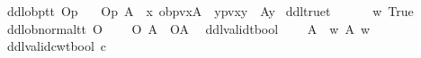 \begin{isabellebody}
\isamarkupfalse%
\ ddlobp{\isacharcolon}{\isacharcolon}{\isachardoublequoteopen}t{\isasymRightarrow}t{\isachardoublequoteclose}\ {\isacharparenleft}{\isachardoublequoteopen}O\isactrlsub p{\isachardoublequoteclose}{\isacharparenright}\isanewline
\ \ \ {\isachardoublequoteopen}O\isactrlsub p\ A\ {\isasymequiv}\ {\isasymlambda}x{\isachardot}\ ob{\isacharparenleft}pv{\isacharparenleft}x{\isacharparenright}{\isacharparenright}{\isacharparenleft}A{\isacharparenright}\ {\isasymand}\ {\isacharparenleft}{\isasymexists}y{\isachardot}{\isacharparenleft}pv{\isacharparenleft}x{\isacharparenright}{\isacharparenleft}y{\isacharparenright}\ {\isasymand}\ {\isasymnot}A{\isacharparenleft}y{\isacharparenright}{\isacharparenright}{\isacharparenright}{\isachardoublequoteclose}\isanewline
\isanewline
%
\isanewline
{}\isamarkupfalse%
\ ddltrue{\isacharcolon}{\isacharcolon}{\isachardoublequoteopen}t{\isachardoublequoteclose}\ {\isacharparenleft}{\isachardoublequoteopen}\isactrlbold {\isasymtop}{\isachardoublequoteclose}{\isacharparenright}\isanewline
\ \ \ {\isachardoublequoteopen}\isactrlbold {\isasymtop}\ {\isasymequiv}\ {\isasymlambda}w{\isachardot}\ True{\isachardoublequoteclose}\isanewline
{}\isamarkupfalse%
\ ddlob{\isacharunderscore}normal{\isacharcolon}{\isacharcolon}{\isachardoublequoteopen}t{\isasymRightarrow}t{\isachardoublequoteclose}\ {\isacharparenleft}{\isachardoublequoteopen}O\ {\isacharbraceleft}{\isacharunderscore}{\isacharbraceright}{\isachardoublequoteclose}{\isacharparenright}\isanewline
\ \ \ {\isachardoublequoteopen}{\isacharparenleft}O\ {\isacharbraceleft}A{\isacharbraceright}{\isacharparenright}\ {\isasymequiv}\ {\isacharparenleft}O{\isacharbraceleft}A{\isacharbar}\isactrlbold {\isasymtop}{\isacharbraceright}{\isacharparenright}\ {\isachardoublequoteclose}\isanewline
\isanewline
%
\isanewline
{}\isamarkupfalse%
\ ddlvalid{\isacharcolon}{\isacharcolon}{\isachardoublequoteopen}t{\isasymRightarrow}bool{\isachardoublequoteclose}\ {\isacharparenleft}{\isachardoublequoteopen}{\isasymTurnstile}{\isacharunderscore}{\isachardoublequoteclose}{\isacharparenright}\isanewline
\ \ \ {\isachardoublequoteopen}{\isasymTurnstile}A\ {\isasymequiv}\ {\isasymforall}w{\isachardot}\ A\ w{\isachardoublequoteclose}\isanewline
{}\isamarkupfalse%
\ ddlvalidcw{\isacharcolon}{\isacharcolon}{\isachardoublequoteopen}t{\isasymRightarrow}bool{\isachardoublequoteclose}\ {\isacharparenleft}{\isachardoublequoteopen}{\isasymTurnstile}\isactrlsub c{\isacharunderscore}{\isachardoublequoteclose}{\isacharparenright}\isanewline

\end{isabellebody}
